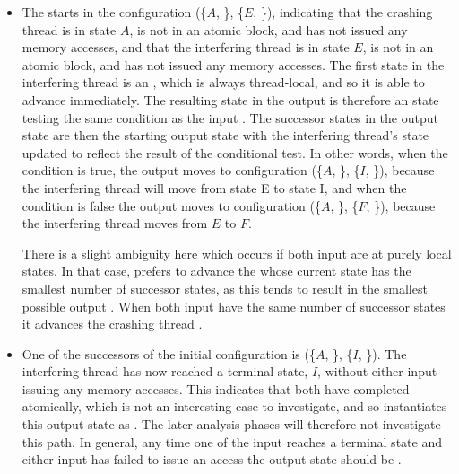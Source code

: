 \begin{itemize}
\item The {\StateMachine} starts in the configuration (\{$A$,
  {\false}\}, \{$E$, {\false}\}), indicating that the crashing thread
  {\StateMachine} is in state $A$, is not in an atomic block, and has
  not issued any memory accesses, and that the interfering thread
  {\StateMachine} is in state $E$, is not in an atomic block, and has
  not issued any memory accesses.  The first state in the interfering
  thread is an , which is always thread-local, and so it is
  able to advance immediately.  The resulting state in the output
  {\StateMachine} is therefore an  state testing the same
  condition as the input .  The successor states in the
  output state are then the starting output state with the interfering
  thread's state updated to reflect the result of the conditional
  test.  In other words, when the condition is true, the output
  {\StateMachine} moves to configuration (\{$A$, {\false}\}, \{$I$,
  {\false}\}), because the interfering thread {\StateMachine} will
  move from state E to state I, and when the condition is false the
  output {\StateMachine} moves to configuration (\{$A$, {\false}\},
  \{$F$, {\false}\}), because the interfering thread {\StateMachine}
  moves from $E$ to $F$.

  There is a slight ambiguity here which occurs if both input
  {\StateMachines} are at purely local states.  In that case,
  {\technique} prefers to advance the {\StateMachine} whose current
  state has the smallest number of successor states, as this tends to
  result in the smallest possible output {\StateMachine}.  When both
  input {\StateMachines} have the same number of successor states it
  advances the crashing thread {\StateMachine}.

\item One of the successors of the initial configuration is (\{$A$,
  {\false}\}, \{$I$, {\false}\}).  The interfering thread
  {\StateMachine} has now reached a terminal state, $I$, without
  either input {\StateMachine} issuing any memory accesses.  This
  indicates that both {\StateMachines} have completed atomically,
  which is not an interesting case to investigate, and so {\technique}
  instantiates this output state as .  The later
  analysis phases will therefore not investigate this path.  In
  general, any time one of the input {\StateMachines} reaches a
  terminal state and either input {\StateMachine} has failed to issue
  an access the output state should be .


\end{itemize}
